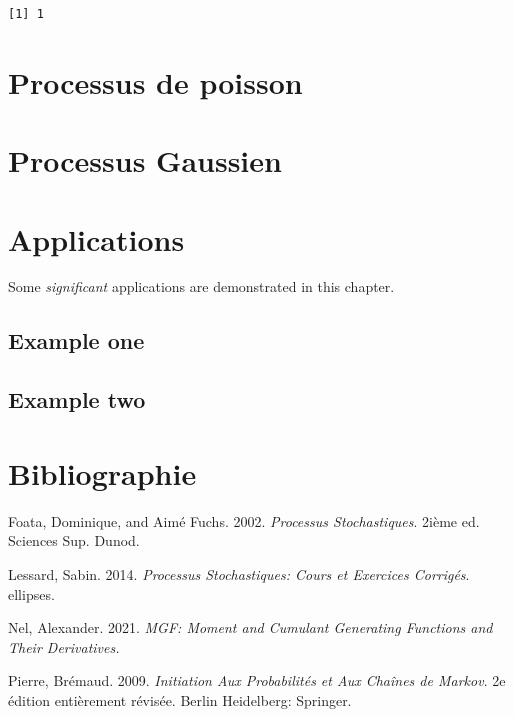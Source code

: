 \documentclass[
]{book}
\theoremstyle{definition}
\theoremstyle{definition}
\theoremstyle{definition}
\theoremstyle{remark}
\begin{document}
\begin{verbatim}
[1] 1
\end{verbatim}

\hypertarget{processus-de-poisson}{%
\chapter{Processus de poisson}\label{processus-de-poisson}}

\hypertarget{processus-gaussien}{%
\chapter{Processus Gaussien}\label{processus-gaussien}}

\hypertarget{applications}{%
\chapter{Applications}\label{applications}}

Some \emph{significant} applications are demonstrated in this chapter.

\hypertarget{example-one}{%
\section{Example one}\label{example-one}}

\hypertarget{example-two}{%
\section{Example two}\label{example-two}}

\hypertarget{bibliographie}{%
\chapter*{Bibliographie}\label{bibliographie}}

\hypertarget{refs}{}
\leavevmode\hypertarget{ref-dominique2002}{}%
Foata, Dominique, and Aimé Fuchs. 2002. \emph{Processus Stochastiques}. 2ième ed. Sciences Sup. Dunod.

\leavevmode\hypertarget{ref-sabin}{}%
Lessard, Sabin. 2014. \emph{Processus Stochastiques: Cours et Exercices Corrigés}. ellipses.

\leavevmode\hypertarget{ref-R-MGF}{}%
Nel, Alexander. 2021. \emph{MGF: Moment and Cumulant Generating Functions and Their Derivatives.}

\leavevmode\hypertarget{ref-bremaud}{}%
Pierre, Brémaud. 2009. \emph{Initiation Aux Probabilités et Aux Chaînes de Markov}. 2e édition entièrement révisée. Berlin Heidelberg: Springer.
\end{document}
